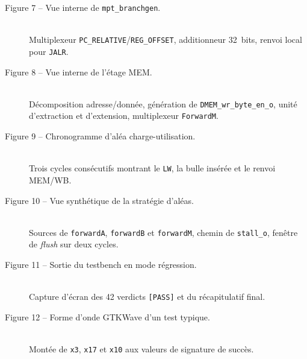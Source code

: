 \documentclass[11pt,a4paper,oneside]{report}
\begin{document}
\begin{description}
  \item[Figure 7  --  Vue interne de
        \texttt{mpt\_branchgen}.]\hfill\\
        Multiplexeur \texttt{PC\_RELATIVE}/\texttt{REG\_OFFSET},
        additionneur 32~bits, renvoi local pour \texttt{JALR}.

  \item[Figure 8  --  Vue interne de l'étage MEM.]\hfill\\
        Décomposition adresse/donnée, génération de
        \texttt{DMEM\_wr\_byte\_en\_o}, unité d'extraction et
        d'extension, multiplexeur \texttt{ForwardM}.

  \item[Figure 9  --  Chronogramme d'aléa
        charge-utilisation.]\hfill\\
        Trois cycles consécutifs montrant le \texttt{LW}, la bulle
        insérée et le renvoi MEM/WB.

  \item[Figure 10  --  Vue synthétique de la stratégie
        d'aléas.]\hfill\\
        Sources de \texttt{forwardA}, \texttt{forwardB} et
        \texttt{forwardM}, chemin de \texttt{stall\_o}, fenêtre de
        \textit{flush} sur deux cycles.

  \item[Figure 11  --  Sortie du testbench en mode
        régression.]\hfill\\
        Capture d'écran des 42 verdicts \texttt{[PASS]} et du
        récapitulatif final.

  \item[Figure 12  --  Forme d'onde GTKWave d'un test
        typique.]\hfill\\
        Montée de \texttt{x3}, \texttt{x17} et \texttt{x10} aux
        valeurs de signature de succès.
\end{description}
\end{document}
